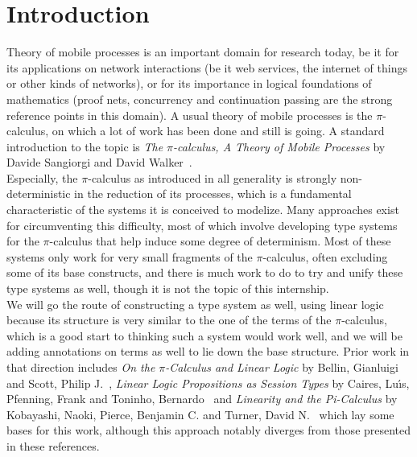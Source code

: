 
\section*{Introduction}

Theory of mobile processes is an important domain for research today, be it for its applications on network interactions (be it web services, the internet of things or other kinds of networks), or for its importance in logical foundations of mathematics (proof nets, concurrency and continuation passing are the strong reference points in this domain). A usual theory of mobile processes is the $\pi$-calculus, on which a lot of work has been done and still is going. A standard introduction to the topic is \emph{The $\pi$-calculus, A Theory of Mobile Processes} by Davide Sangiorgi and David Walker~\cite{sangiorgi-2001-pi-calculus}.\\

Especially, the $\pi$-calculus as introduced in all generality is strongly non-deterministic in the reduction of its processes, which is a fundamental characteristic of the systems it is conceived to modelize. Many approaches exist for circumventing this difficulty, most of which involve developing type systems for the $\pi$-calculus that help induce some degree of determinism. Most of these systems only work for very small fragments of the $\pi$-calculus, often excluding some of its base constructs, and there is much work to do to try and unify these type systems as well, though it is not the topic of this internship.\\

We will go the route of constructing a type system as well, using linear logic because its structure is very similar to the one of the terms of the $\pi$-calculus, which is a good start to thinking such a system would work well, and we will be adding annotations on terms as well to lie down the base structure. Prior work in that direction includes \emph{On the $\pi$-Calculus and Linear Logic} by Bellin, Gianluigi and Scott, Philip J.~\cite{bellin-1994-calculus}, \emph{Linear Logic Propositions as Session Types} by Caires, Lu{\'\i}s, Pfenning, Frank and Toninho, Bernardo~\cite{caires-2016-linear} and \emph{Linearity and the Pi-Calculus} by Kobayashi, Naoki, Pierce, Benjamin C. and Turner, David N.~\cite{kobayashi-1999-linearity} which lay some bases for this work, although this approach notably diverges from those presented in these references.\\

